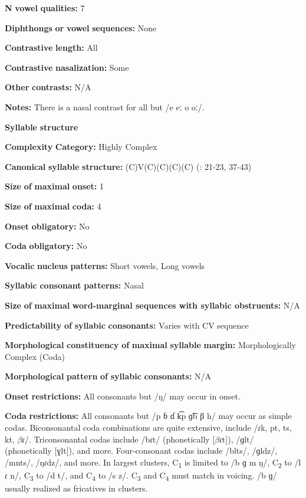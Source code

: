\begin{styleBody}
\textbf{N} \textbf{vowel} \textbf{qualities:} 7

\textbf{Diphthongs} \textbf{or} \textbf{vowel} \textbf{sequences:} None

\textbf{Contrastive} \textbf{length:} All

\textbf{Contrastive} \textbf{nasalization:} Some

\textbf{Other} \textbf{contrasts:} N/A

\textbf{Notes:} There is a nasal contrast for all but /e eː o oː/.

\textbf{Syllable} \textbf{structure}

\textbf{Complexity} \textbf{Category:} Highly Complex

\textbf{Canonical} \textbf{syllable} \textbf{structure:} (C)V(C)(C)(C)(C) (\citealt{WieringWiering1994}: 21-23, 37-43)

\textbf{Size} \textbf{of} \textbf{maximal} \textbf{onset:} 1

\textbf{Size} \textbf{of} \textbf{maximal} \textbf{coda:} 4

\textbf{Onset} \textbf{obligatory:} No

\textbf{Coda} \textbf{obligatory:} No

\textbf{Vocalic} \textbf{nucleus} \textbf{patterns:} Short vowels, Long vowels

\textbf{Syllabic} \textbf{consonant} \textbf{patterns:} Nasal

\textbf{Size} \textbf{of} \textbf{maximal} \textbf{word{}-marginal sequences with syllabic obstruents:} N/A

\textbf{Predictability} \textbf{of} \textbf{syllabic} \textbf{consonants:} Varies with CV sequence

\textbf{Morphological} \textbf{constituency} \textbf{of} \textbf{maximal} \textbf{syllable} \textbf{margin:} Morphologically Complex (Coda)

\textbf{Morphological} \textbf{pattern} \textbf{of} \textbf{syllabic} \textbf{consonants:} N/A

\textbf{Onset} \textbf{restrictions:} All consonants but /ŋ/ may occur in onset.

\textbf{Coda} \textbf{restrictions:} All consonants but /p ɓ ɗ k͡p ɡ͡b β h/ may occur as simple codas. Biconsonantal coda combinations are quite extensive, include /ɾk, pt, ts, kt, $\beta ɾ$/. Triconsonantal codas include /bɾt/ (phonetically [$\beta ɾ$t]), /ɡlt/ (phonetically [ɣlt]), and more. Four-consonant codas include /blts/, /ɡldz/, /mnts/, /ŋɾdz/, and more. In largest clusters, C\textsubscript{1} is limited to /b ɡ m ŋ/, C\textsubscript{2} to /l ɾ n/, C\textsubscript{3} to /d t/, and C\textsubscript{4} to /s z/. C\textsubscript{3} and C\textsubscript{4} must match in voicing. /b ɡ/ usually realized as fricatives in clusters.


\end{styleBody}
